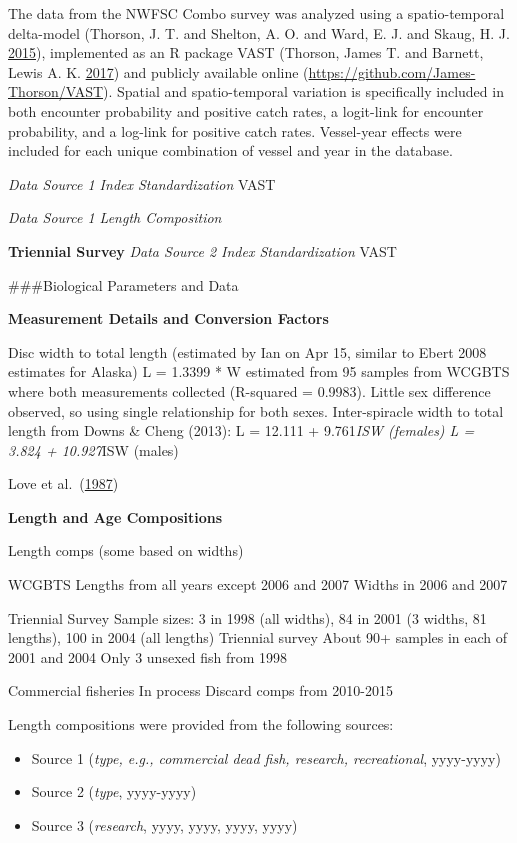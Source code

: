 \documentclass[12pt,]{article}
\begin{document}
The data from the NWFSC Combo survey was analyzed using a
spatio-temporal delta-model (Thorson, J. T. and Shelton, A. O. and Ward,
E. J. and Skaug, H. J. \protect\hyperlink{ref-Thorson2015}{2015}),
implemented as an R package VAST (Thorson, James T. and Barnett, Lewis
A. K. \protect\hyperlink{ref-Thorson2017a}{2017}) and publicly available
online (\url{https://github.com/James-Thorson/VAST}). Spatial and
spatio-temporal variation is specifically included in both encounter
probability and positive catch rates, a logit-link for encounter
probability, and a log-link for positive catch rates. Vessel-year
effects were included for each unique combination of vessel and year in
the database.

\emph{Data Source 1 Index Standardization} VAST

\emph{Data Source 1 Length Composition}

\textbf{Triennial Survey} \emph{Data Source 2 Index Standardization}
VAST

\newpage

\#\#\#Biological Parameters and Data

\textbf{Measurement Details and Conversion Factors}

Disc width to total length (estimated by Ian on Apr 15, similar to Ebert
2008 estimates for Alaska) L = 1.3399 * W estimated from 95 samples from
WCGBTS where both measurements collected (R-squared = 0.9983). Little
sex difference observed, so using single relationship for both sexes.
Inter-spiracle width to total length from Downs \& Cheng (2013): L =
12.111 + 9.761\emph{ISW (females) L = 3.824 + 10.927}ISW (males)

Love et al.~(\protect\hyperlink{ref-Love1987}{1987})

\textbf{Length and Age Compositions}

Length comps (some based on widths)

WCGBTS Lengths from all years except 2006 and 2007 Widths in 2006 and
2007

Triennial Survey Sample sizes: 3 in 1998 (all widths), 84 in 2001 (3
widths, 81 lengths), 100 in 2004 (all lengths) Triennial survey About
90+ samples in each of 2001 and 2004 Only 3 unsexed fish from 1998

Commercial fisheries In process Discard comps from 2010-2015

Length compositions were provided from the following sources:

\begin{itemize}[noitemsep,nolistsep,topsep=0pt]
  \item Source 1 (\emph{type, e.g., commercial dead fish, research, recreational}, yyyy-yyyy)    
  \item Source 2 (\emph{type}, yyyy-yyyy)    
  \item Source 3 (\emph{research}, yyyy, yyyy, yyyy, yyyy) 
\end{itemize}
\end{document}
